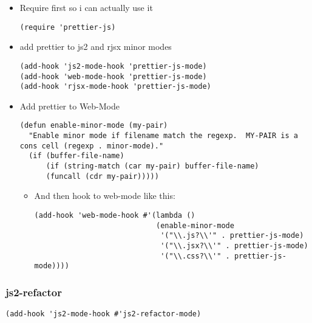\documentclass[11pt]{article}
\begin{document}
\begin{itemize}
\item Require first so i can actually use it
\label{sec:orgf35e3dc}

\begin{verbatim}
(require 'prettier-js)
\end{verbatim}

\item add prettier to js2 and rjsx minor modes
\label{sec:org813bf63}

\begin{verbatim}
(add-hook 'js2-mode-hook 'prettier-js-mode)
(add-hook 'web-mode-hook 'prettier-js-mode)
(add-hook 'rjsx-mode-hook 'prettier-js-mode)
\end{verbatim}

\item Add prettier to Web-Mode
\label{sec:org1a46a6e}
\begin{verbatim}
(defun enable-minor-mode (my-pair)
  "Enable minor mode if filename match the regexp.  MY-PAIR is a cons cell (regexp . minor-mode)."
  (if (buffer-file-name)
      (if (string-match (car my-pair) buffer-file-name)
      (funcall (cdr my-pair)))))
\end{verbatim}

\begin{itemize}
\item And then hook to web-mode like this:
\label{sec:orgca8b13f}

\begin{verbatim}
(add-hook 'web-mode-hook #'(lambda ()
                            (enable-minor-mode
                             '("\\.js?\\'" . prettier-js-mode)
                             '("\\.jsx?\\'" . prettier-js-mode)
                             '("\\.css?\\'" . prettier-js-mode))))
\end{verbatim}
\end{itemize}
\end{itemize}

\subsubsection*{js2-refactor}
\label{sec:org16e240a}
\begin{verbatim}
(add-hook 'js2-mode-hook #'js2-refactor-mode)
\end{verbatim}
\end{document}
